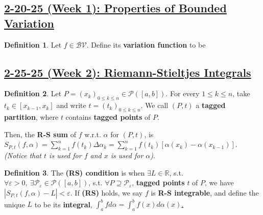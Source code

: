 \documentclass[12pt,a4paper]{article}
\theoremstyle{definition}
\newtheorem{defin}{Definition}[subsection]
\newenvironment{definition}{
  \begin{defin}
}{
  \end{defin}
  \vspace{0.125em}
}
\begin{document}
\setcounter{defin}{0}
\setcounter{ex}{0}
\subsection*{\underline{\textbf{2-20-25 (Week 1): Properties of Bounded Variation}}}
\begin{definition}
  Let $f \in \mathcal{BV}$. Define its \textbf{variation function} to be \raisebox{-1.33em}{$\begin{aligned} V:\ [a, b] &\longrightarrow \mathbb{R} \\ x &\longmapsto \left\{ \begin{array}{ll} 0 &\text{if $x = a$} \\ V_f([a, b]) \quad &\text{if $x \in (a, b]$} \end{array} \right. \end{aligned}$}
\end{definition}

\setcounter{defin}{0}
\setcounter{ex}{0}
\subsection*{\underline{\textbf{2-25-25 (Week 2): Riemann-Stieltjes Integrals}}}
\begin{definition}
  Let $P = (x_k)_{0 \leq k \leq n} \in \mathcal{P}([a, b])$. For every $1 \leq k \leq n$, take $t_k \in [x_{k - 1}, x_k]$ and write $t = (t_k)_{0 \leq k \leq n}$. We call $(P, t)$ a \textbf{tagged partition}, where $t$ contains \textbf{tagged points} of $P$. \newline

  \noindent Then, the \textbf{R-S sum} of $f$ w.r.t. $\alpha$ for $(P, t)$, is \underline{$S_{P, t}(f, \alpha) = \sum_{k = 1}^n f(t_k) \Delta \alpha_k = \sum_{k = 1}^n f(t_k)[\alpha(x_k) - \alpha(x_{k- 1})]$}. \textit{(Notice that $t$ is used for $f$ and $x$ is used for $\alpha$)}.
\end{definition}

\begin{definition}
  The \textbf{(RS) condition} is when $\exists L \in \mathbb{R}$, s.t. $\forall \varepsilon > 0,\ \exists \mathcal{P}_\varepsilon \in \mathcal{P}([a, b])$, s.t. $\forall P \supseteq \mathcal{P}_\varepsilon$, \textbf{tagged points} $t$ of $P$, we have \underline{$|S_{P, t} (f, \alpha) - L| < \varepsilon$}. If \textbf{(RS)} holds, we say $f$ is \textbf{R-S integrable}, and define the unique $L$ to be its \textbf{integral}, \underline{$\int_a^b f d \alpha = \int_a^b f(x) d\alpha(x)$.}
\end{definition}
\end{document}
